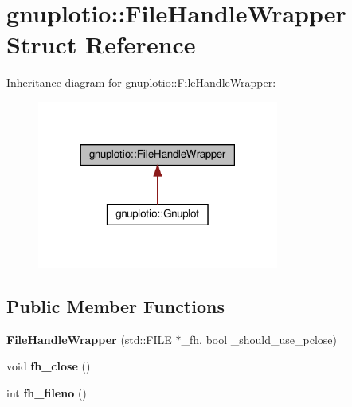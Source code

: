 \hypertarget{structgnuplotio_1_1FileHandleWrapper}{}\section{gnuplotio\+:\+:File\+Handle\+Wrapper Struct Reference}
\label{structgnuplotio_1_1FileHandleWrapper}


Inheritance diagram for gnuplotio\+:\+:File\+Handle\+Wrapper\+:
\nopagebreak
\begin{figure}[H]
\begin{center}
\leavevmode
\includegraphics[width=225pt]{structgnuplotio_1_1FileHandleWrapper__inherit__graph}
\end{center}
\end{figure}
\subsection*{Public Member Functions}
\begin{DoxyCompactItemize}
\item 
\mbox{\label{structgnuplotio_1_1FileHandleWrapper_a26b2378e193a9c41be5aed97e11f9411}} 
{\bfseries File\+Handle\+Wrapper} (std\+::\+F\+I\+LE $\ast$\+\_\+fh, bool \+\_\+should\+\_\+use\+\_\+pclose)
\item 
\mbox{\label{structgnuplotio_1_1FileHandleWrapper_acafac45efd9c78ce621af4f3228c6f67}} 
void {\bfseries fh\+\_\+close} ()
\item 
\mbox{\label{structgnuplotio_1_1FileHandleWrapper_a3202ccd15d624f26dd2cf699d3456de6}} 
int {\bfseries fh\+\_\+fileno} ()
\end{DoxyCompactItemize}
